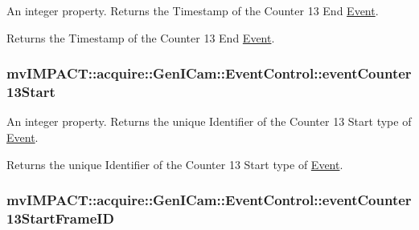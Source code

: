 An integer property. Returns the Timestamp of the Counter 13 End \hyperlink{classmv_i_m_p_a_c_t_1_1acquire_1_1_event}{Event}. 

Returns the Timestamp of the Counter 13 End \hyperlink{classmv_i_m_p_a_c_t_1_1acquire_1_1_event}{Event}. \hypertarget{classmv_i_m_p_a_c_t_1_1acquire_1_1_gen_i_cam_1_1_event_control_aad41e035b4e3f21a3fff09989666d8e6}{
\subsubsection[{event\+Counter13\+Start}]{ mv\+I\+M\+P\+A\+C\+T\+::acquire\+::\+Gen\+I\+Cam\+::\+Event\+Control\+::event\+Counter13\+Start}}\label{classmv_i_m_p_a_c_t_1_1acquire_1_1_gen_i_cam_1_1_event_control_aad41e035b4e3f21a3fff09989666d8e6}


An integer property. Returns the unique Identifier of the Counter 13 Start type of \hyperlink{classmv_i_m_p_a_c_t_1_1acquire_1_1_event}{Event}. 

Returns the unique Identifier of the Counter 13 Start type of \hyperlink{classmv_i_m_p_a_c_t_1_1acquire_1_1_event}{Event}. \hypertarget{classmv_i_m_p_a_c_t_1_1acquire_1_1_gen_i_cam_1_1_event_control_a2f9484f2d79d11cf946b5f7e4977eaaf}{
\subsubsection[{event\+Counter13\+Start\+Frame\+I\+D}]{ mv\+I\+M\+P\+A\+C\+T\+::acquire\+::\+Gen\+I\+Cam\+::\+Event\+Control\+::event\+Counter13\+Start\+Frame\+I\+D}}\label{classmv_i_m_p_a_c_t_1_1acquire_1_1_gen_i_cam_1_1_event_control_a2f9484f2d79d11cf946b5f7e4977eaaf}


